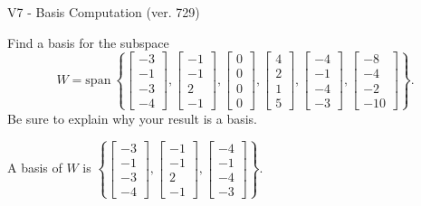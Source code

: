 \begin{exercise}
  \begin{exerciseTitle}V7 - Basis Computation (ver. 729)\end{exerciseTitle}
  \begin{exerciseStatement}
    Find a basis for the subspace 
\[W=\mathrm{span}\ \left\{\left[\begin{array}{r}
-3 \\
-1 \\
-3 \\
-4
\end{array}\right] , \left[\begin{array}{r}
-1 \\
-1 \\
2 \\
-1
\end{array}\right] , \left[\begin{array}{r}
0 \\
0 \\
0 \\
0
\end{array}\right] , \left[\begin{array}{r}
4 \\
2 \\
1 \\
5
\end{array}\right] , \left[\begin{array}{r}
-4 \\
-1 \\
-4 \\
-3
\end{array}\right] , \left[\begin{array}{r}
-8 \\
-4 \\
-2 \\
-10
\end{array}\right]\right\}.\]
 Be sure to explain why your result is a basis.


  \end{exerciseStatement}
  \begin{exerciseAnswer}
   A basis of \(W\) is  \(\left\{\left[\begin{array}{r}
-3 \\
-1 \\
-3 \\
-4
\end{array}\right] , \left[\begin{array}{r}
-1 \\
-1 \\
2 \\
-1
\end{array}\right] , \left[\begin{array}{r}
-4 \\
-1 \\
-4 \\
-3
\end{array}\right]\right\}\).
  


  \end{exerciseAnswer}
\end{exercise}
